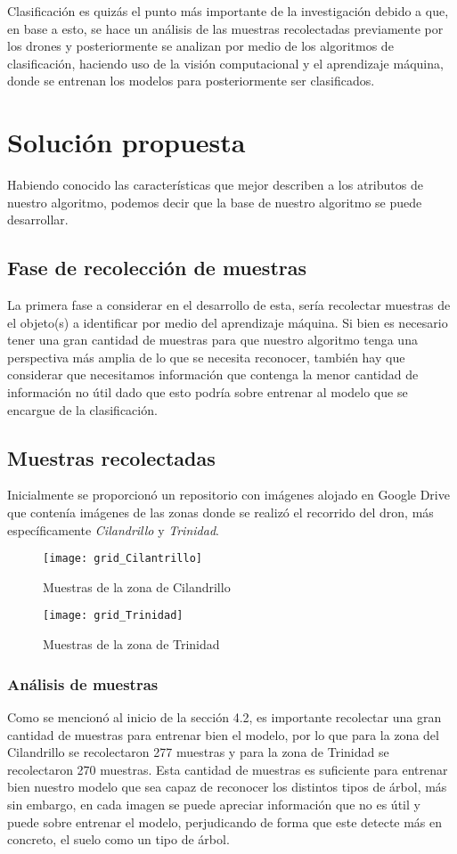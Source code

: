 Clasificación es quizás el punto más importante de la investigación debido a que, en base a esto, se hace un análisis de las muestras recolectadas previamente por los drones y posteriormente se analizan por medio de los algoritmos de clasificación, haciendo uso de la visión computacional y el aprendizaje máquina, donde se entrenan los modelos para posteriormente ser clasificados.


\chapter{Solución propuesta}
Habiendo conocido las características que mejor describen a los atributos de nuestro algoritmo, podemos decir que la base de nuestro algoritmo se puede desarrollar.

\section{Fase de recolección de muestras}
La primera fase a considerar en el desarrollo de esta, sería recolectar muestras de el objeto(s) a identificar por medio del aprendizaje máquina. Si bien es necesario tener una gran cantidad de muestras para que nuestro algoritmo tenga una perspectiva más amplia de lo que se necesita reconocer, también hay que considerar que necesitamos información que contenga la menor cantidad de información no útil dado que esto podría sobre entrenar al modelo que se encargue de la clasificación.

\section{Muestras recolectadas}
Inicialmente se proporcionó un repositorio con imágenes alojado en Google Drive que contenía imágenes de las zonas donde se realizó el recorrido del dron, más específicamente \emph{Cilandrillo} y \emph{Trinidad}.

\begin{figure}
 \centering
\texttt{[image: grid\_Cilantrillo]}
\caption{Muestras de la zona de Cilandrillo}
\end{figure}

\begin{figure}
 \centering
\texttt{[image: grid\_Trinidad]}
\caption{Muestras de la zona de Trinidad}
\end{figure}

\subsection{Análisis de muestras}
Como se mencionó al inicio de la sección 4.2, es importante recolectar una gran cantidad de muestras para entrenar bien el modelo, por lo que para la zona del Cilandrillo se recolectaron 277 muestras y para la zona de Trinidad se recolectaron 270 muestras. Esta cantidad de muestras es suficiente para entrenar bien nuestro modelo que sea capaz de reconocer los distintos tipos de árbol, más sin embargo, en cada imagen se puede apreciar información que no es útil y puede sobre entrenar el modelo, perjudicando de forma que este detecte más en concreto, el suelo como un tipo de árbol.

